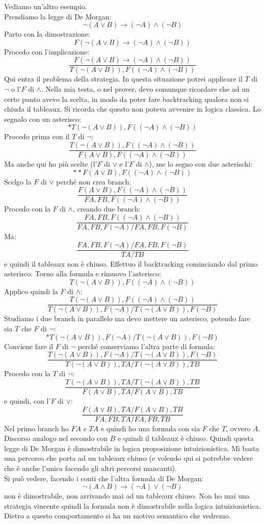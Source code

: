 \documentclass[a4paper,12pt, oneside]{book}
\begin{document}
\begin{esempio}
  Vediamo un'altro esempio.\\
  Prendiamo la legge di De Morgan:
  \[\neg (A\lor B)\to (\neg A)\land (\neg B)\]
  Parto con la dimostrazione:
  \[F(\neg (A\lor B)\to (\neg A)\land (\neg B))\]
  Procedo con l'implicazione:
  \[\frac{F(\neg (A\lor B)\to (\neg A)\land (\neg B))}{T(\neg (A\lor B)),F((\neg
      A)\land (\neg B))}\]
  Qui entra il problema della strategia. In questa situazione potrei applicare
  il $T$ di $\neg$ o l'$F$ di $\land$. Nella mia testa, o nel prover, devo
  comunque ricordare che ad un certo punto avevo la scelta, in modo da poter
  fare backtracking qualora non si chiuda il tableaux. Si ricorda che questo non
  poteva avvenire in logica classica. Lo segnalo con un
  asterisco:
  \[*T(\neg (A\lor B)),F((\neg A)\land (\neg B))\]
  Procedo prima con il $T$ di $\neg$:
  \[\frac{T(\neg (A\lor B)),F((\neg A)\land (\neg B))}{F(A\lor B), F((\neg
      A)\land (\neg B))}\]
  Ma anche qui ho più scelte (l'$F$ di $\lor$ e l'$F$ di $\land$), me lo segno
  con due asterischi: 
  \[**F(A\lor B), F((\neg A)\land (\neg B))\]
  Scelgo la $F$ di $\lor$ perché non crea branch:
  \[\frac{F(A\lor B), F((\neg A)\land (\neg B))}{FA, FB, F((\neg A)\land (\neg
      B))}\]
  Procedo con la $F$ di $\land$, creando due branch:
  \[\frac{FA, FB, F((\neg A)\land (\neg B))}{FA, FB, F(\neg A)/ FA, FB, F(\neg
      B)}\]
  Ma:
  \[\frac{FA, FB, F(\neg A)/ FA, FB, F(\neg B)}{TA/TB}\]
  e quindi il tableaux non è chiuso. Effettuo il backtracking cominciando dal
  primo asterisco. Torno alla formula e rimuovo l'asterisco:
  \[T(\neg (A\lor B)),F((\neg A)\land (\neg B))\]
  Applico quindi la $F$ di $\land$:
  \[\frac{T(\neg (A\lor B)),F((\neg A)\land (\neg B))}{T(\neg (A\lor B)),F(\neg
      A)/T(\neg (A\lor B)),F(\neg B)}\]
  Studiamo i due branch in parallelo ma devo mettere un asterisco, potendo fare
  sia $T$ che $F$ di $\neg$:
  \[*T(\neg (A\lor B)),F(\neg A)/T(\neg (A\lor B)),F(\neg B)\]
  Conviene fare il $F$ di $\neg$ perché conserviamo l'altra parte di formula:
  \[\frac{T(\neg (A\lor B)),F(\neg A)/T(\neg (A\lor B)),F(\neg B)}{T(\neg (A\lor
      B)),TA/T(\neg (A\lor B)),TB}\] 
  Procedo con la $T$ di $\neg$:
  \[\frac{T(\neg (A\lor B)),TA/T(\neg (A\lor B)),TB}{F(A\lor B),TA/F(A\lor B),
      TB}\]
  e quindi, con l'$F$ di $\lor$:
  \[\frac{F(A\lor B),TA/F(A\lor B), TB}{FA,FB,TA/FA,FB,TB}\]
  Nel primo branch ho $FA$ e $TA$ e quindi ho una formula con sia $F$ che $T$,
  ovvero $A$. Discorso analogo nel secondo con $B$ e quindi il tableaux è
  chiuso. Quindi questa legge di De Morgan è dimostrabile in logica
  proposizione intuizionistica. Mi basta una percorso che porta ad un
  tableaux chiuso (e volendo qui si potrebbe vedere che è anche l'unica facendo
  gli altri percorsi mancanti). \\
  Si può vedere, facendo i conti che l'altra formula di De Morgan:
  \[\neg (A\land B)\to (\neg A)\lor (\neg B)\]
  non è dimostrabile, non arrivando mai ad un tableaux chiuso. Non ho mai una
  strategia vincente  quindi la formula non è dimostrabile nella logica
  intuizionistica. Dietro a questo comportamento si ha un motivo semantico che
  vedremo.  
\end{esempio}
\end{document}
